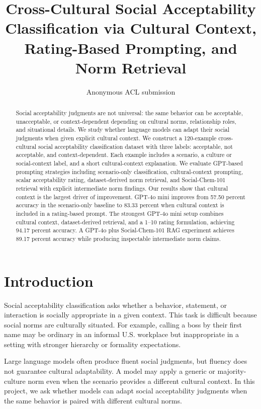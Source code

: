 \documentclass{article}
\title{Cross-Cultural Social Acceptability Classification via Cultural Context, Rating-Based Prompting, and Norm Retrieval}
\author{Anonymous ACL submission}
\date{}
\begin{document}
\maketitle

\begin{abstract}
Social acceptability judgments are not universal: the same behavior can be acceptable, unacceptable, or context-dependent depending on cultural norms, relationship roles, and situational details. We study whether language models can adapt their social judgments when given explicit cultural context. We construct a 120-example cross-cultural social acceptability classification dataset with three labels: acceptable, not acceptable, and context-dependent. Each example includes a scenario, a culture or social-context label, and a short cultural-context explanation. We evaluate GPT-based prompting strategies including scenario-only classification, cultural-context prompting, scalar acceptability rating, dataset-derived norm retrieval, and Social-Chem-101 retrieval with explicit intermediate norm findings. Our results show that cultural context is the largest driver of improvement. GPT-4o mini improves from 57.50 percent accuracy in the scenario-only baseline to 83.33 percent when cultural context is included in a rating-based prompt. The strongest GPT-4o mini setup combines cultural context, dataset-derived retrieval, and a 1--10 rating formulation, achieving 94.17 percent accuracy. A GPT-4o plus Social-Chem-101 RAG experiment achieves 89.17 percent accuracy while producing inspectable intermediate norm claims.
\end{abstract}

\section{Introduction}

Social acceptability classification asks whether a behavior, statement, or interaction is socially appropriate in a given context. This task is difficult because social norms are culturally situated. For example, calling a boss by their first name may be ordinary in an informal U.S. workplace but inappropriate in a setting with stronger hierarchy or formality expectations.

Large language models often produce fluent social judgments, but fluency does not guarantee cultural adaptability. A model may apply a generic or majority-culture norm even when the scenario provides a different cultural context. In this project, we ask whether models can adapt social acceptability judgments when the same behavior is paired with different cultural norms.
\end{document}
